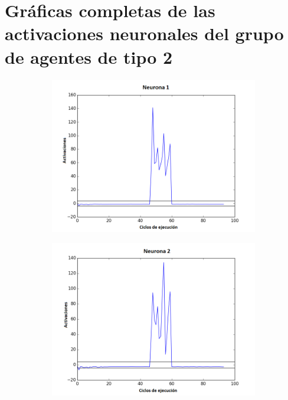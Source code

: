 \chapter{Gráficas completas de las activaciones neuronales del grupo de agentes de tipo 2}\label{ch:anexo4}
\begin{figure}[!h]
    \centering %
\begin{subfigure}{0.33\textwidth}
  \includegraphics[width=\linewidth]{Imagenes/Agente2Activaciones/Agente0/Neurona0}
\end{subfigure}\hfil %
\begin{subfigure}{0.33\textwidth}
  \includegraphics[width=\linewidth]{Imagenes/Agente2Activaciones/Agente0/Neurona1}

\end{subfigure}
\end{figure}
